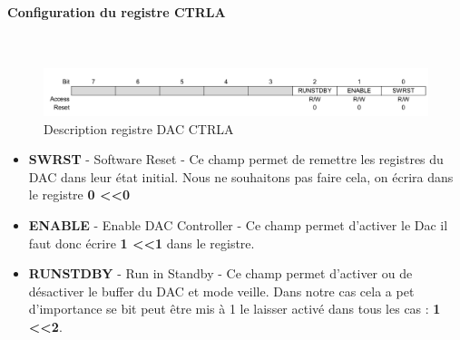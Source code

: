 \documentclass[a4paper]{article}
\begin{document}
	\paragraph{Configuration du registre CTRLA} ~~\\
	\begin{figure}[H]
		\centering
		\includegraphics[width=12cm]{DAC_CTRLA}
		\caption{Description registre DAC CTRLA}
	\end{figure}
\begin{itemize}
	\item \textbf{SWRST} - Software Reset - Ce champ permet de remettre les registres du DAC dans leur état initial. Nous ne souhaitons pas faire cela, on écrira dans le registre \textbf{0 \textless \textless 0}\\
	\item \textbf{ENABLE} - Enable DAC Controller - Ce champ permet d'activer le Dac il faut donc écrire \textbf{1 \textless \textless 1} dans le registre.\\
	\item \textbf{RUNSTDBY} - Run in Standby - Ce champ permet d'activer ou de désactiver le buffer du DAC et mode veille. Dans notre cas cela a pet d'importance se bit peut être mis à 1 le laisser activé dans tous les cas : \textbf{1 \textless \textless 2}.
\end{itemize}
\end{document}
